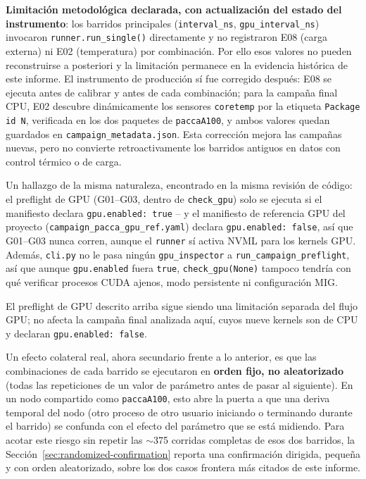 \documentclass[11pt]{article}
\begin{document}
\textbf{Limitación metodológica declarada, con actualización del estado del
instrumento}: los barridos principales (\texttt{interval\_ns},
\texttt{gpu\_interval\_ns}) invocaron \texttt{runner.run\_single()}
directamente y no registraron E08 (carga externa) ni E02 (temperatura) por
combinación. Por ello esos valores no pueden reconstruirse a posteriori y
la limitación permanece en la evidencia histórica de este informe. El
instrumento de producción sí fue corregido después: E08 se ejecuta antes de
calibrar y antes de cada combinación; para la campaña final CPU, E02
descubre dinámicamente los sensores \texttt{coretemp} por la etiqueta
\texttt{Package id N}, verificada en los dos paquetes de
\texttt{paccaA100}, y ambos valores quedan guardados en
\texttt{campaign\_metadata.json}. Esta corrección mejora las campañas
nuevas, pero no convierte retroactivamente los barridos antiguos en datos
con control térmico o de carga.

Un hallazgo de la misma naturaleza, encontrado en la misma revisión de
código: el preflight de GPU (G01--G03, dentro de \texttt{check\_gpu}) solo
se ejecuta si el manifiesto declara \texttt{gpu.enabled: true} -- y el
manifiesto de referencia GPU del proyecto
(\texttt{campaign\_pacca\_gpu\_ref.yaml}) declara
\texttt{gpu.enabled: false}, así que G01--G03 nunca corren, aunque el
\texttt{runner} sí activa NVML para los kernels GPU. Además, \texttt{cli.py}
no le pasa ningún \texttt{gpu\_inspector} a
\texttt{run\_campaign\_preflight}, así que aunque \texttt{gpu.enabled}
fuera \texttt{true}, \texttt{check\_gpu(None)} tampoco tendría con qué
verificar procesos CUDA ajenos, modo persistente ni configuración MIG.

El preflight de GPU descrito arriba sigue siendo una limitación separada del
flujo GPU; no afecta la campaña final analizada aquí, cuyos nueve kernels son
de CPU y declaran \texttt{gpu.enabled: false}.

Un efecto colateral real, ahora secundario frente a lo anterior, es que las
combinaciones de cada
barrido se ejecutaron en \textbf{orden fijo, no aleatorizado} (todas las
repeticiones de un valor de parámetro antes de pasar al siguiente). En un
nodo compartido como \texttt{paccaA100}, esto abre la puerta a que una
deriva temporal del nodo (otro proceso de otro usuario iniciando o
terminando durante el barrido) se confunda con el efecto del parámetro que
se está midiendo. Para acotar este riesgo sin repetir las $\sim$375
corridas completas de esos dos barridos, la Sección~\ref{sec:randomized-confirmation} reporta
una confirmación dirigida, pequeña y con orden aleatorizado, sobre los dos
casos frontera más citados de este informe.
\end{document}
